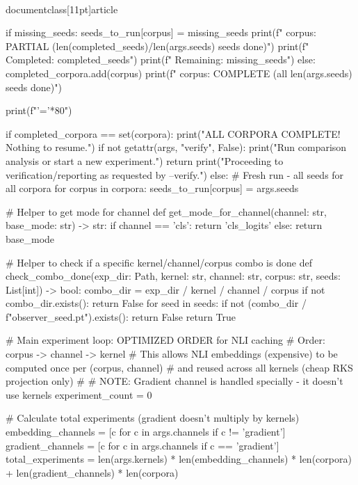 \\documentclass[11pt]{article}
\begin{document}
\begin{CodeBlock}
            if missing_seeds:
                seeds_to_run[corpus] = missing_seeds
                print(f"  {corpus}: PARTIAL ({len(completed_seeds)}/{len(args.seeds)} seeds done)")
                print(f"     Completed: {completed_seeds}")
                print(f"     Remaining: {missing_seeds}")
            else:
                completed_corpora.add(corpus)
                print(f"  {corpus}:  COMPLETE (all {len(args.seeds)} seeds done)")
        
        print(f"{'='*80}")
        
        if completed_corpora == set(corpora):
            print("\n ALL CORPORA COMPLETE! Nothing to resume.")
            if not getattr(args, "verify", False):
                print("Run comparison analysis or start a new experiment.")
                return
            print("Proceeding to verification/reporting as requested by --verify.")
    else:
        # Fresh run - all seeds for all corpora
        for corpus in corpora:
            seeds_to_run[corpus] = args.seeds

    # Helper to get mode for channel
    def get_mode_for_channel(channel: str, base_mode: str) -> str:
        if channel == 'cls':
            return 'cls_logits'
        else:
            return base_mode
    
    # Helper to check if a specific kernel/channel/corpus combo is done
    def check_combo_done(exp_dir: Path, kernel: str, channel: str, corpus: str, seeds: List[int]) -> bool:
        combo_dir = exp_dir / kernel / channel / corpus
        if not combo_dir.exists():
            return False
        for seed in seeds:
            if not (combo_dir / f"observer_{seed}.pt").exists():
                return False
        return True

    # Main experiment loop: OPTIMIZED ORDER for NLI caching
    # Order: corpus -> channel -> kernel
    # This allows NLI embeddings (expensive) to be computed once per (corpus, channel)
    # and reused across all kernels (cheap RKS projection only)
    #
    # NOTE: Gradient channel is handled specially - it doesn't use kernels
    experiment_count = 0

    # Calculate total experiments (gradient doesn't multiply by kernels)
    embedding_channels = [c for c in args.channels if c != 'gradient']
    gradient_channels = [c for c in args.channels if c == 'gradient']
    total_experiments = len(args.kernels) * len(embedding_channels) * len(corpora) + len(gradient_channels) * len(corpora)


\end{CodeBlock}
\end{document}
